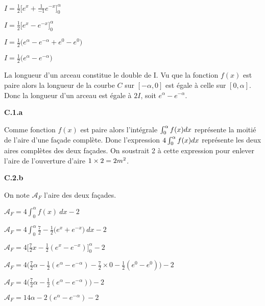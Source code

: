\documentclass{article}
\begin{document}
$I = \displaystyle\frac{1}{2} \Big[e^x + \displaystyle\frac{1}{-1} e^{-x}\Big]_0^\alpha$

$I = \displaystyle\frac{1}{2} \Big[e^x - e^{-x}\Big]_0^\alpha$

$I = \displaystyle\frac{1}{2} \big(e^{\alpha} - e^{-\alpha} + e^0- e^0 \big)$

$I = \displaystyle\frac{1}{2} \big(e^{\alpha} - e^{-\alpha} \big)$

\vspace{2mm}

\noindent La longueur d'un arceau constitue le double de I. 
Vu que la fonction $f(x)$ est paire alors la longueur de la courbe $C$ sur $[-\alpha, 0]$ est égale à celle sur $[0, \alpha]$. 
Donc la longueur d'un arceau est égale à $2I$, soit $e^{\alpha}-e^{-\alpha}$.

\vspace{2mm}
\textbf{C.1.a}
\vspace{2mm}

\noindent Comme fonction $f(x)$ est paire alors l'intégrale $\int^{\alpha}_0 f(x) \space dx$ représente la moitié de l'aire d'une façade complète. Donc l'expression $4 \int^{\alpha}_0 f(x) \space dx$ représente les deux aires complètes des deux façades. On soustrait 2 à cette expression pour enlever l'aire de l'ouverture d'aire $1 \times 2 = 2 \space m^2$.

\vspace{2mm}
\textbf{C.2.b}
\vspace{2mm}

\noindent On note $\mathcal{A}_F$ l'aire des deux façades.

$\mathcal{A}_{F} = 4\displaystyle\int_0^{\alpha} f(x) \: dx - 2$

$\mathcal{A}_{F} = 4\displaystyle\int_0^{\alpha} \displaystyle\frac{7}{2} - \displaystyle\frac{1}{2} \Big(e^x + e^{-x}\Big) \: dx - 2$

$\mathcal{A}_{F} = 4 \Bigg[ \displaystyle\frac{7}{2}x - \displaystyle\frac{1}{2}(e^x - e^{-x}) \Bigg]^{\alpha}_0 - 2$

$\mathcal{A}_{F} = 4 \Bigg( \displaystyle\frac{7}{2}\alpha - \displaystyle\frac{1}{2}(e^{\alpha} - e^{-\alpha}) - \displaystyle\frac{7}{2} \times 0 - \displaystyle\frac{1}{2}(e^0 - e^{0}) \Bigg) - 2$

$\mathcal{A}_{F} = 4 \Bigg( \displaystyle\frac{7}{2}\alpha - \displaystyle\frac{1}{2}(e^{\alpha} - e^{-\alpha}) \Bigg) - 2$

$\mathcal{A}_{F} = 14\alpha - 2(e^{\alpha} - e^{-\alpha}) - 2$
\end{document}

